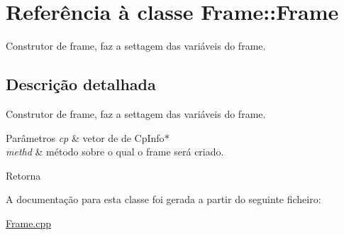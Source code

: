 \hypertarget{class_frame_1_1_frame}{}\section{Referência à classe Frame\+:\+:Frame}
\label{class_frame_1_1_frame}


Construtor de frame, faz a settagem das variáveis do frame.  




\subsection{Descrição detalhada}
Construtor de frame, faz a settagem das variáveis do frame. 


\begin{DoxyParams}{Parâmetros}
{\em cp} & vetor de de Cp\+Info$\ast$ \\
\hline
{\em methd} & método sobre o qual o frame será criado. \\
\hline
\end{DoxyParams}
\begin{DoxyReturn}{Retorna}

\end{DoxyReturn}


A documentação para esta classe foi gerada a partir do seguinte ficheiro\+:\begin{DoxyCompactItemize}
\item 
\hyperlink{_frame_8cpp}{Frame.\+cpp}\end{DoxyCompactItemize}

